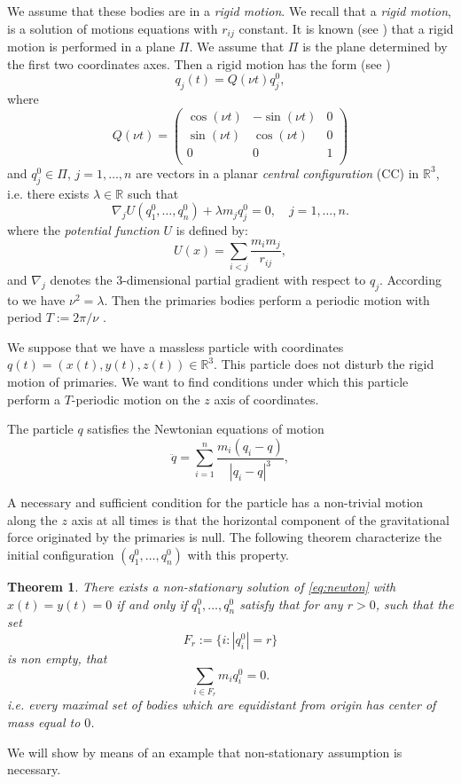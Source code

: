 \documentclass[twoside]{article}
\newtheorem{thm}{Theorem}[section]
\theoremstyle{remark}
\newcommand{\rr}{\mathbb{R}}
\newcounter{example}
\begin{document}
We assume that these bodies are in a \emph{rigid motion}. We recall that a \emph{rigid  motion}, is a solution of motions equations with $r_{ij}$ constant.  It is known (see \cite{ AurelWintner272}) that a rigid motion is performed in a plane $\Pi$. We assume that $\Pi$ is the plane determined by the first two coordinates axes. Then a rigid motion has the form (see \cite{JaumeLlibre276})
\[q_j(t)=Q(\nu t)q^0_j,\]
where
\[
 Q(\nu t)=\begin{pmatrix}
           \cos(\nu t) & -\sin(\nu t) & 0\\
           \sin(\nu t) & \cos(\nu t) & 0\\
           0            &     0     &  1\\
          \end{pmatrix}
\]
and $q^0_j\in\Pi$, $j=1,\ldots,n$ are vectors in a planar \emph{central configuration} (CC) in $\rr^3$, i.e. there exists $\lambda\in\rr$ such that
\[ \nabla_jU(q^0_1,\ldots,q^0_n)+\lambda m_jq^0_j=0,\quad j=1,\ldots,n.\]
where the \emph{potential function} $U$ is defined by:
\begin{equation}\label{eq:potencial}
 U(x)=\sum_{i<j}\frac{m_im_j}{r_{ij}},
\end{equation}
and $\nabla_j$ denotes the $3$-dimensional partial gradient with respect to $q_j$.
According to \cite[Eq. (2.16)]{JaumeLlibre276} we have $\nu^2=\lambda$. Then the primaries bodies perform a periodic motion with period $T:=2\pi/\nu$ .

We suppose that we have a massless particle with coordinates $q(t)=(x(t),y(t),z(t))\in\rr^3$. This particle does not disturb the rigid motion of  primaries.  We want to find conditions under which this particle perform a $T$-periodic motion on the $z$ axis of coordinates.

The particle $q$ satisfies the Newtonian equations of motion
\begin{equation}\label{eq:newton}
 \ddot{q}=\sum_{i=1}^n\frac{m_i(q_i-q)}{|q_i-q|^3},
\end{equation}

A necessary and sufficient condition for the particle  has a non-trivial motion along the $z$ axis at all times is that the horizontal component of the gravitational force originated by the primaries is null. The following theorem characterize the initial configuration $(q_1^0,\ldots,q_n^0)$ with this property.


\begin{thm}\label{thm:prim} There exists a non-stationary  solution of \eqref{eq:newton} with $x(t)=y(t)=0$ if and only if $q^0_1,\ldots,q^ 0_n$ satisfy that for any $r>0$, such that the set
\[F_r:=\{i:|q_i^ 0|=r\}\]
is non empty, that
\begin{equation}\label{eq:suma0}\sum_{i\in F_r}m_iq_i^ 0=0.\end{equation}
i.e. every maximal set of  bodies which are equidistant from origin has center of mass equal to $0$.
\end{thm}
We will show by means of an example that non-stationary assumption is necessary.
\end{document}
